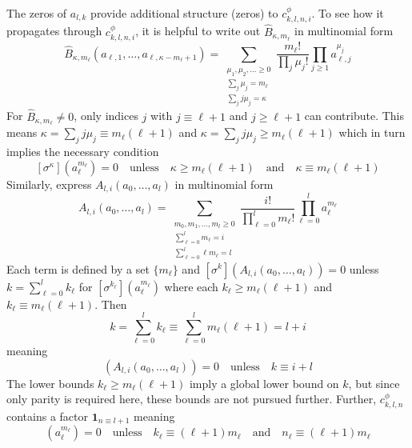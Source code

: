 \documentclass[a4paper]{amsart}
\begin{document}
The zeros of $a_{l,k}$ provide additional structure (zeros) to $c^{\phi}_{k,l,n,i}$. To see how it propagates through $c^{\phi}_{k,l,n,i}$, it is helpful to write out $\hat{B}_{\kappa,m_\ell}$ in multinomial form
\begin{equation*}
\hat B_{\kappa,m_\ell}(a_{\ell,1},\dots,a_{\ell,\kappa-m_\ell+1})=
\sum_{\substack{\mu_1,\mu_2,\dots\ge 0\\
\sum_j \mu_j=m_\ell\\
\sum_j j\mu_j=\kappa}}
\frac{m_\ell!}{\prod_j \mu_j!}\prod_{j\ge 1} a_{\ell,j}^{\mu_j}
\end{equation*}
For $\hat{B}_{\kappa,m_\ell}\neq 0$, only indices $j$ with $j\equiv \ell+1$ and $j\ge \ell+1$ can contribute. This means $\kappa=\sum_j j\mu_j\equiv m_\ell(\ell+1)$ and $\kappa=\sum_j j\mu_j\geq m_\ell(\ell+1)$
which in turn implies the necessary condition
\begin{equation}\label{eq:parity_implications}
[\sigma^\kappa](a_\ell^{m_\ell})=0 \quad\text{unless}\quad \kappa\ge m_\ell(\ell+1)\quad\text{and}\quad\kappa\equiv m_\ell(\ell+1)
\end{equation}
Similarly, express $A_ {l,i}(a_0,\dots,a_l)$ in multinomial form
\begin{equation*}
A_ {l,i}(a_0,\dots,a_l)
=\sum_{\substack{m_0,m_1,\dots,m_l\ge 0\\
\sum_{\ell=0}^l m_\ell=i\\
\sum_{\ell=0}^l \ell m_\ell=l}}
\frac{i!}{\prod_{\ell=0}^l m_\ell!}
\prod_{\ell=0}^l a_\ell^{m_\ell}
\end{equation*}
Each term is defined by a set $\{m_\ell\}$ and $[\sigma^k](A_ {l,i}(a_0,\dots,a_l))= 0$ unless $k=\sum_{\ell=0}^l k_\ell$ for $[\sigma^{k_\ell}](a_\ell^{m_\ell})$ where each $k_\ell \geq m_\ell(\ell+1)$ and $k_\ell\equiv m_\ell(\ell+1)$.
Then
\begin{equation*}
k=\sum_{\ell=0}^l k_\ell\equiv \sum_{\ell=0}^lm_\ell(\ell+1)=l+i
\end{equation*}
meaning
\begin{equation*}
[\sigma^k](A_ {l,i}(a_0,\dots,a_l))=0\quad\text{unless}\quad k\equiv i+l
\end{equation*}
The lower bounds $k_\ell\geq m_\ell(\ell+1)$ imply a global lower bound on $k$, but since only parity is required here, these bounds are not pursued further.
%
Further, $c^{\phi}_{k,l,n}$ contains a factor $\mathbf{1}_{n\equiv l+1}$ meaning
\begin{equation*}
[\epsilon^{n_\ell}][\sigma^{k_\ell}](a^{m_\ell}_{\ell}) = 0\quad\text{unless}\quad k_\ell\equiv (\ell+1)m_\ell\quad\text{and}\quad n_\ell\equiv (\ell+1)m_\ell
\end{equation*}
\end{document}
